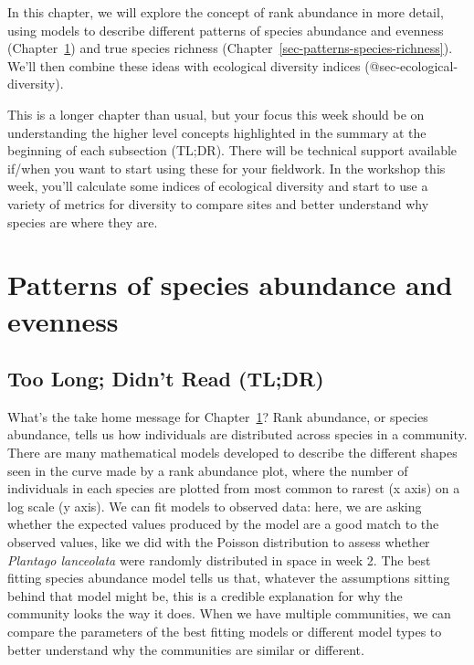 \documentclass[
  letterpaper,
  DIV=11,
  numbers=noendperiod]{scrreprt}
\begin{document}
In this chapter, we will explore the concept of rank abundance in more
detail, using models to describe different patterns of species abundance
and evenness (Chapter~\ref{sec-abundance-and-evenness}) and true species
richness (Chapter~\ref{sec-patterns-species-richness}). We'll then
combine these ideas with ecological diversity indices
(@sec-ecological-diversity).~

This is a longer chapter than usual, but your focus this week should be
on understanding the higher level concepts highlighted in the summary at
the beginning of each subsection (TL;DR). There will be technical
support available if/when you want to start using these for your
fieldwork. In the workshop this week, you'll calculate some indices of
ecological diversity and start to use a variety of metrics for diversity
to compare sites and better understand why species are where they are.~

\chapter{Patterns of species abundance and
evenness}\label{sec-abundance-and-evenness}

\section{Too Long; Didn't Read (TL;DR)}\label{too-long-didnt-read-tldr}

What's the take home message for
Chapter~\ref{sec-abundance-and-evenness}? Rank abundance, or species
abundance, tells us how individuals are distributed across species in a
community. There are many mathematical models developed to describe the
different shapes seen in the curve made by a rank abundance plot, where
the number of individuals in each species are plotted from most common
to rarest (x axis) on a log scale (y axis). We can fit models to
observed data: here, we are asking whether the expected values produced
by the model are a good match to the observed values, like we did with
the Poisson distribution to assess whether \emph{Plantago lanceolata}
were randomly distributed in space in week 2. The best fitting species
abundance model tells us that, whatever the assumptions sitting behind
that model might be, this is a credible explanation for why the
community looks the way it does. When we have multiple communities, we
can compare the parameters of the best fitting models or different model
types to better understand why the communities are similar or different.
\end{document}
